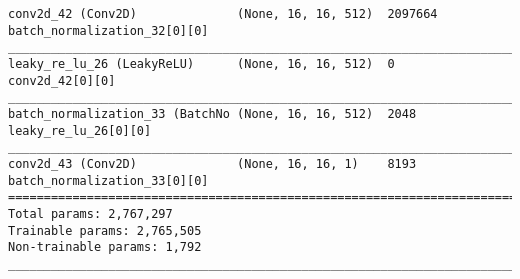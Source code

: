 \begin{verbatim}
conv2d_42 (Conv2D)              (None, 16, 16, 512)  2097664     batch_normalization_32[0][0]     
__________________________________________________________________________________________________
leaky_re_lu_26 (LeakyReLU)      (None, 16, 16, 512)  0           conv2d_42[0][0]                  
__________________________________________________________________________________________________
batch_normalization_33 (BatchNo (None, 16, 16, 512)  2048        leaky_re_lu_26[0][0]             
__________________________________________________________________________________________________
conv2d_43 (Conv2D)              (None, 16, 16, 1)    8193        batch_normalization_33[0][0]     
==================================================================================================
Total params: 2,767,297
Trainable params: 2,765,505
Non-trainable params: 1,792
__________________________________________________________________________________________________
\end{verbatim}